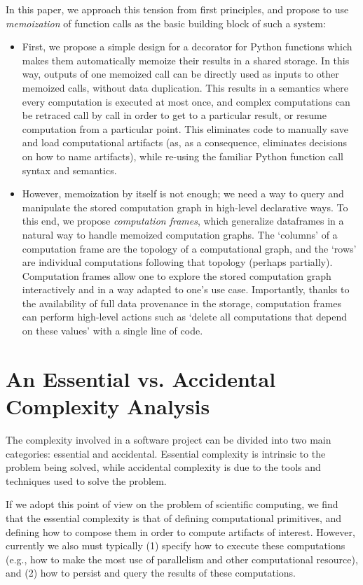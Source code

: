\documentclass[11pt,twoside=semi,openright,numbers=noenddot]{scrartcl}
\begin{document}
In this paper, we approach this tension from first principles, and propose to
use \emph{memoization} of function calls as the basic building block of such a
system:
\begin{itemize}
\item First, we propose a simple design for a decorator for Python functions
which makes them automatically memoize their results in a shared storage. In
this way, outputs of one memoized call can be directly used as inputs to other
memoized calls, without data duplication. This results in a semantics where
every computation is executed at most once, and complex computations can be
retraced call by call in order to get to a particular result, or resume
computation from a particular point. This eliminates code to manually save and
load computational artifacts (as, as a consequence, eliminates decisions on how
to name artifacts), while re-using the familiar Python function call syntax and
semantics.
\item However, memoization by itself is not enough; we need a way to query and
manipulate the stored computation graph in high-level declarative ways. To this
end, we propose \emph{computation frames}, which generalize dataframes in a
natural way to handle memoized computation graphs. The `columns' of a
computation frame are the topology of a computational graph, and the `rows' are
individual computations following that topology (perhaps partially).
Computation frames allow one to explore the stored computation graph
interactively and in a way adapted to one's use case. Importantly, thanks to the
availability of full data provenance in the storage, computation frames can
perform high-level actions such as `delete all computations that depend on these
values' with a single line of code.
\end{itemize}


\section{An Essential vs. Accidental Complexity Analysis}
\label{subsection:}

The complexity involved in a software project can be divided into two main
categories: essential and accidental. Essential complexity is intrinsic to the
problem being solved, while accidental complexity is due to the tools and
techniques used to solve the problem. 

If we adopt this point of view on the problem of scientific computing, we find
that the essential complexity is that of defining computational
primitives, and defining how to compose them in order to compute artifacts of 
interest. However, currently we also must typically (1) specify how to 
execute these computations (e.g., how to make the most use of parallelism and other computational resource), and (2) how to persist and query the results of these computations.
\end{document}
